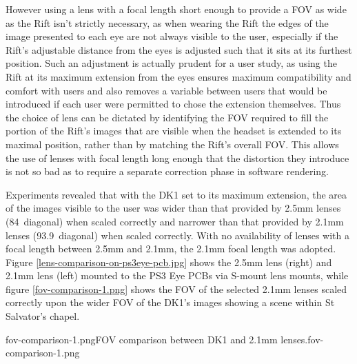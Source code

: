 However using a lens with a focal length short enough to provide a FOV as wide as the Rift isn't strictly necessary, as when wearing the Rift the edges of the image presented to each eye are not always visible to the user, especially if the Rift's adjustable distance from the eyes is adjusted such that it sits at its furthest position. Such an adjustment is actually prudent for a user study, as using the Rift at its maximum extension from the eyes ensures maximum compatibility and comfort with users and also removes a variable between users that would be introduced if each user were permitted to chose the extension themselves. Thus the choice of lens can be dictated by identifying the FOV required to fill the portion of the Rift's images that are visible when the headset is extended to its maximal position, rather than by matching the Rift's overall FOV. This allows the use of lenses with focal length long enough that the distortion they introduce is not so bad as to require a separate correction phase in software rendering.

Experiments revealed that with the DK1 set to its maximum extension, the area of the images visible to the user was wider than that provided by 2.5mm lenses (84\textdegree\ diagonal) when scaled correctly and narrower than that provided by 2.1mm lenses (93.9\textdegree\ diagonal) when scaled correctly. With no availability of lenses with a focal length between 2.5mm and 2.1mm, the 2.1mm focal length was adopted. Figure \ref{lens-comparison-on-ps3eye-pcb.jpg} shows the 2.5mm lens (right) and 2.1mm lens (left) mounted to the PS3 Eye PCBs via S-mount lens mounts, while figure \ref{fov-comparison-1.png} shows the FOV of the selected 2.1mm lenses scaled correctly upon the wider FOV of the DK1's images showing a scene within St Salvator's chapel.

       {fov-comparison-1.png}{FOV comparison between DK1 and 2.1mm lenses.}{fov-comparison-1.png}


